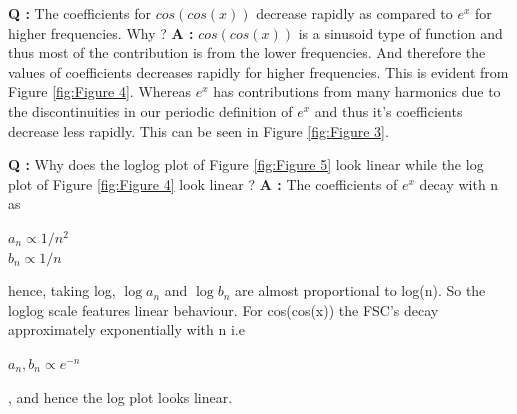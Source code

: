\documentclass[11pt, a4paper]{article}
\begin{document}
\noindent\textbf{Q :} The coefficients for $cos(cos(x))$ decrease rapidly as compared to $e^x$ for higher frequencies. Why ?\newline
\textbf{A :} $cos(cos(x))$ is a sinusoid type of function and thus most of the contribution is from the lower frequencies. And therefore the values of coefficients decreases rapidly for higher frequencies. This is evident from Figure \ref{fig:Figure 4}. Whereas $e^x$ has contributions from many harmonics due to the discontinuities in our periodic definition of $e^x$ and thus it's coefficients decrease less rapidly. This can be seen in Figure \ref{fig:Figure 3}.\newline\newline

\noindent\textbf{Q :} Why does the loglog plot of Figure \ref{fig:Figure 5} look linear while the log plot of Figure \ref{fig:Figure 4} look linear ?\newline
\textbf{A :} The coefficients of $e^x$ decay with n as\\ \begin{center}
    $a_n \propto 1/n^2$\\ $b_n \propto 1/n$ 
\end{center} hence, taking log, $\log a_n$ and $\log b_n$ are almost proportional to log(n). So the loglog scale features linear behaviour. For cos(cos(x)) the FSC’s decay approximately exponentially with n i.e \begin{center}
    $a_n , b_n \propto e^{-n}$
\end{center}, and hence the log plot looks linear.
\end{document}
